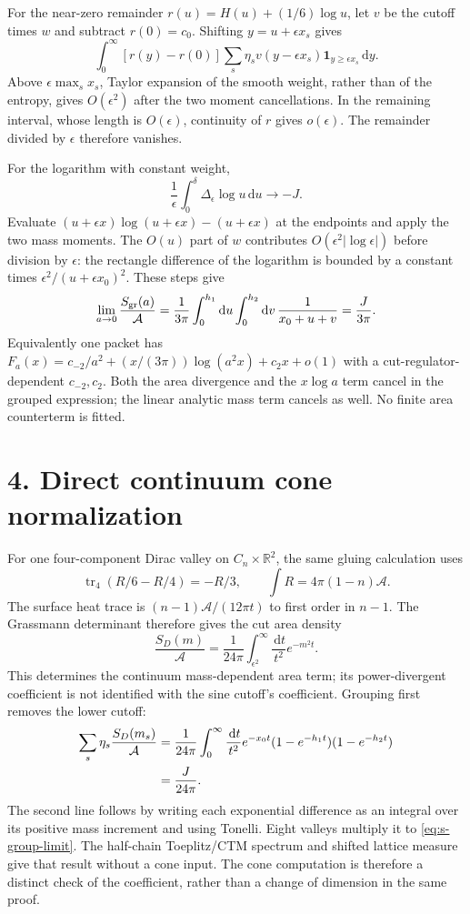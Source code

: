 \documentclass[10pt]{article}
\newcommand{\tr}{\operatorname{tr}}
\newcommand{\id}{\mathbf 1}
\newcommand{\dd}{\,\mathrm d}
\begin{document}
For the near-zero remainder $r(u)=H(u)+(1/6)\log u$, let $v$
be the cutoff times $w$ and subtract $r(0)=c_0$. Shifting
$y=u+\epsilon x_s$ gives
\[
 \int_0^\infty[r(y)-r(0)]
 \sum_s\eta_s v(y-\epsilon x_s)
                 \id_{y\ge\epsilon x_s}\dd y.
\]
Above $\epsilon\max_sx_s$, Taylor expansion of the smooth
weight, rather than of the entropy, gives $O(\epsilon^2)$ after
the two moment cancellations. In the remaining interval, whose
length is $O(\epsilon)$, continuity of $r$ gives $o(\epsilon)$.
The remainder divided by $\epsilon$ therefore vanishes.

For the logarithm with constant weight,
\[
 \frac1\epsilon\int_0^\delta
       \Delta_\epsilon\log u\dd u\longrightarrow-J.
\]
Evaluate $(u+\epsilon x)\log(u+\epsilon x)-(u+\epsilon x)$
at the endpoints and apply the two mass moments. The $O(u)$
part of $w$ contributes $O(\epsilon^2|\log\epsilon|)$ before
division by $\epsilon$: the rectangle difference of the logarithm
is bounded by a constant times
$\epsilon^2/(u+\epsilon x_0)^2$. These steps give
\begin{equation}
 \lim_{a\to0}\frac{S_{\rm gr}(a)}{\mathcal A}
 =\frac1{3\pi}\int_0^{h_1}\!\dd u\int_0^{h_2}\!\dd v\,
       \frac1{x_0+u+v}
 =\frac{J}{3\pi}.
 \label{eq:s-group-limit}
\end{equation}
Equivalently one packet has
$F_a(x)=c_{-2}/a^2+(x/(3\pi))\log(a^2x)+c_2x+o(1)$
with a cut-regulator-dependent $c_{-2},c_2$. Both the area divergence
and the $x\log a$ term cancel in the grouped expression; the
linear analytic mass term cancels as well. No finite area counterterm
is fitted.

\section*{4. Direct continuum cone normalization}
For one four-component Dirac valley on
$C_n\times\mathbb R^2$, the same gluing calculation uses
\[
 \tr_4(R/6-R/4)=-R/3,
 \qquad\int R=4\pi(1-n)\mathcal A.
\]
The surface heat trace is
$(n-1)\mathcal A/(12\pi t)$ to first order in $n-1$.
The Grassmann determinant therefore gives the cut area density
\begin{equation}
 \frac{S_D(m)}{\mathcal A}
 =\frac1{24\pi}\int_{\epsilon^2}^{\infty}
          \frac{\dd t}{t^2}e^{-m^2t}.
 \label{eq:s-cone}
\end{equation}
This determines the continuum mass-dependent area term; its
power-divergent coefficient is not identified with the sine cutoff's
coefficient. Grouping first removes the lower cutoff:
\begin{align}
 \sum_s\eta_s\frac{S_D(m_s)}{\mathcal A}
 &=\frac1{24\pi}\int_0^{\infty}\frac{\dd t}{t^2}
 e^{-x_0t}(1-e^{-h_1t})(1-e^{-h_2t})\notag\\
 &=\frac{J}{24\pi}.
 \label{eq:s-cone-group}
\end{align}
The second line follows by writing each exponential difference as
an integral over its positive mass increment and using Tonelli.
Eight valleys multiply it to \eqref{eq:s-group-limit}. The
half-chain Toeplitz/CTM spectrum and shifted lattice measure give
that result without a cone input. The cone computation is therefore
a distinct check of the coefficient, rather than a change of
dimension in the same proof.
\end{document}
